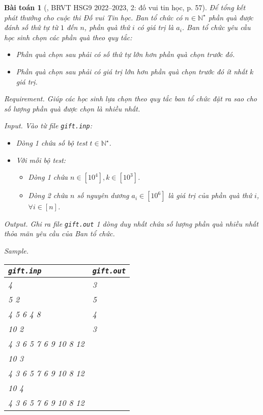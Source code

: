 \documentclass{article}
\newtheorem{baitoan}{Bài toán}
\begin{document}
\begin{baitoan}[\cite{Trung_THCS_Tin}, BRVT HSG9 2022--2023, 2: đố vui tin học, p. 57]
	Để tổng kết phát thưởng cho cuộc thi Đố vui Tin học. Ban tổ chức có $n\in\mathbb{N}^\star$ phần quà được đánh số thứ tự từ $1$ đến $n$, phần quà thứ $i$ có giá trị là $a_i$. Ban tổ chức yêu cầu học sinh chọn các phần quà theo quy tắc:
	\begin{itemize}
		\item Phần quà chọn sau phải có số thứ tự lớn hơn phần quà chọn trước đó.
		\item Phần quà chọn sau phải có giá trị lớn hơn phần quà chọn trước đó ít nhất $k$ giá trị.
	\end{itemize}
	\item {\sf Requirement.} Giúp các học sinh lựa chọn theo quy tắc ban tổ chức đặt ra sao cho số lượng phần quà được chọn là nhiều nhất.
	\item {\sf Input.} Vào từ file {\tt gift.inp}:
	\begin{itemize}
		\item Dòng 1 chứa số bộ test $t\in\mathbb{N}^\star$.
		\item Với mỗi bộ test:
		\begin{itemize}
			\item Dòng 1 chứa $n\in[10^4],k\in[10^3]$.
			\item Dòng 2 chứa $n$ số nguyên dương $a_i\in[10^6]$ là giá trị của phần quà thứ $i$, $\forall i\in[n]$.
		\end{itemize}
	\end{itemize}
	\item {\sf Output.} Ghi ra file {\tt gift.out} 1 dòng duy nhất chứa số lượng phần quà nhiều nhất thỏa mãn yêu cầu của Ban tổ chức.
	\item {\sf Sample.}
	\begin{table}[H]
		\centering
		\begin{tabular}{|l|l|}
			\hline
			{\tt gift.inp} & {\tt gift.out} \\
			\hline
			4 & 3 \\
			5 2 & 5 \\
			4 5 6 4 8 & 4 \\
			10 2 & 3 \\
			4 3 6 5 7 6 9 10 8 12 & \\
			10 3 & \\
			4 3 6 5 7 6 9 10 8 12 & \\
			10 4 & \\
			4 3 6 5 7 6 9 10 8 12 & \\
			\hline
		\end{tabular}
	\end{table}
\end{baitoan}
\end{document}

